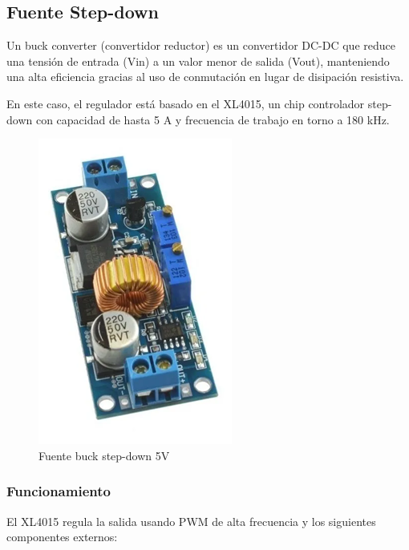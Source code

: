 \documentclass[12pt,a4paper]{article}
\begin{document}
\subsection{Fuente Step-down}
Un buck converter (convertidor reductor) es un convertidor DC-DC que reduce una tensión de entrada (Vin) a un valor menor de salida (Vout), manteniendo una alta eficiencia gracias al uso de conmutación en lugar de disipación resistiva.

En este caso, el regulador está basado en el XL4015, un chip controlador step-down con capacidad de hasta 5 A y frecuencia de trabajo en torno a 180 kHz.

\begin{figure}[H]
\centering
\includegraphics[width=0.5\linewidth]{Carpeta tecnica/Imagen4.png} %
\caption{Fuente buck step-down 5V}
\end{figure}

\subsubsection{Funcionamiento}

El XL4015 regula la salida usando PWM de alta frecuencia y los siguientes componentes externos:
\end{document}
